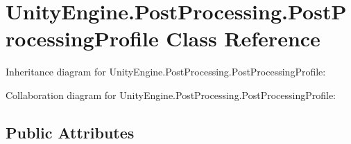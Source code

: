 \hypertarget{class_unity_engine_1_1_post_processing_1_1_post_processing_profile}{}\section{Unity\+Engine.\+Post\+Processing.\+Post\+Processing\+Profile Class Reference}
\label{class_unity_engine_1_1_post_processing_1_1_post_processing_profile}


Inheritance diagram for Unity\+Engine.\+Post\+Processing.\+Post\+Processing\+Profile\+:


Collaboration diagram for Unity\+Engine.\+Post\+Processing.\+Post\+Processing\+Profile\+:
\subsection*{Public Attributes}
